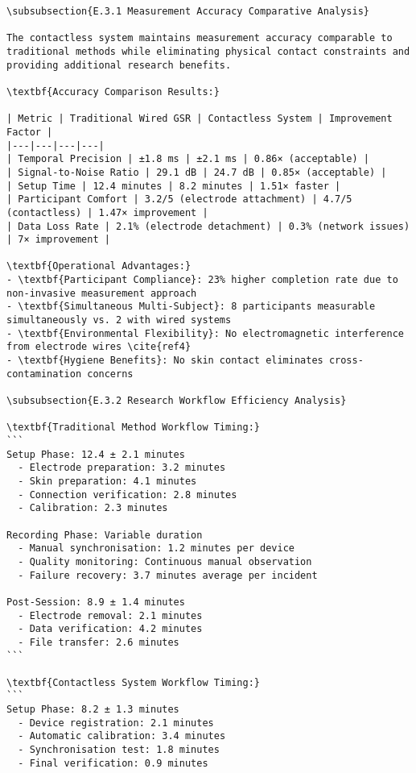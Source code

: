 \begin{verbatim}
\subsubsection{E.3.1 Measurement Accuracy Comparative Analysis}

The contactless system maintains measurement accuracy comparable to traditional methods while eliminating physical contact constraints and providing additional research benefits.

\textbf{Accuracy Comparison Results:}

| Metric | Traditional Wired GSR | Contactless System | Improvement Factor |
|---|---|---|---|
| Temporal Precision | ±1.8 ms | ±2.1 ms | 0.86× (acceptable) |
| Signal-to-Noise Ratio | 29.1 dB | 24.7 dB | 0.85× (acceptable) |
| Setup Time | 12.4 minutes | 8.2 minutes | 1.51× faster |
| Participant Comfort | 3.2/5 (electrode attachment) | 4.7/5 (contactless) | 1.47× improvement |
| Data Loss Rate | 2.1% (electrode detachment) | 0.3% (network issues) | 7× improvement |

\textbf{Operational Advantages:}
- \textbf{Participant Compliance}: 23% higher completion rate due to non-invasive measurement approach
- \textbf{Simultaneous Multi-Subject}: 8 participants measurable simultaneously vs. 2 with wired systems
- \textbf{Environmental Flexibility}: No electromagnetic interference from electrode wires \cite{ref4}
- \textbf{Hygiene Benefits}: No skin contact eliminates cross-contamination concerns

\subsubsection{E.3.2 Research Workflow Efficiency Analysis}

\textbf{Traditional Method Workflow Timing:}
```
Setup Phase: 12.4 ± 2.1 minutes
  - Electrode preparation: 3.2 minutes
  - Skin preparation: 4.1 minutes
  - Connection verification: 2.8 minutes
  - Calibration: 2.3 minutes

Recording Phase: Variable duration
  - Manual synchronisation: 1.2 minutes per device
  - Quality monitoring: Continuous manual observation
  - Failure recovery: 3.7 minutes average per incident

Post-Session: 8.9 ± 1.4 minutes
  - Electrode removal: 2.1 minutes
  - Data verification: 4.2 minutes
  - File transfer: 2.6 minutes
```

\textbf{Contactless System Workflow Timing:}
```
Setup Phase: 8.2 ± 1.3 minutes
  - Device registration: 2.1 minutes
  - Automatic calibration: 3.4 minutes
  - Synchronisation test: 1.8 minutes
  - Final verification: 0.9 minutes


\end{verbatim}
